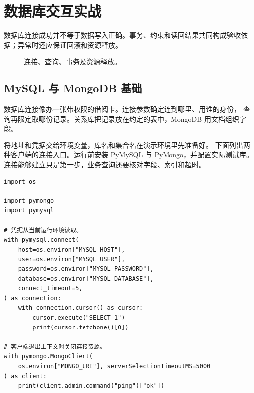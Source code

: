 \documentclass[UTF8,a4paper,oneside,openany,fontset=none,11pt]{ctexbook}
\newcommand{\code}[1]{\texttt{\detokenize{#1}}}
\begin{document}
\chapter{数据库交互实战}
\label{ch:14-outline}

数据库连接成功并不等于数据写入正确。事务、约束和读回结果共同构成验收依据；异常时还应保证回滚和资源释放。


\begin{figure}[htbp]
  \centering
  \caption*{连接、查询、事务及资源释放。}
\end{figure}


\section{MySQL 与 MongoDB 基础}

数据库连接像办一张带权限的借阅卡。连接参数确定连到哪里、用谁的身份，
查询再限定取哪份记录。关系库把记录放在约定的表中，MongoDB 用文档组织字段。

将地址和凭据交给环境变量，库名和集合名在演示环境里先准备好。
下面列出两种客户端的连接入口。运行前安装 PyMySQL 与 PyMongo，并配置实际测试库。
连接能够建立只是第一步，业务查询还要核对字段、索引和超时。


\begin{lstlisting}[title={\code{external_databases.py}}]
import os

import pymongo
import pymysql

# 凭据从当前运行环境读取。
with pymysql.connect(
    host=os.environ["MYSQL_HOST"],
    user=os.environ["MYSQL_USER"],
    password=os.environ["MYSQL_PASSWORD"],
    database=os.environ["MYSQL_DATABASE"],
    connect_timeout=5,
) as connection:
    with connection.cursor() as cursor:
        cursor.execute("SELECT 1")
        print(cursor.fetchone()[0])

# 客户端退出上下文时关闭连接资源。
with pymongo.MongoClient(
    os.environ["MONGO_URI"], serverSelectionTimeoutMS=5000
) as client:
    print(client.admin.command("ping")["ok"])
\end{lstlisting}
\end{document}
